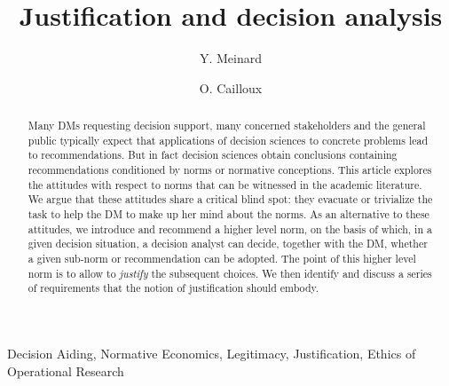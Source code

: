 \documentclass[preprint, french, english, 11pt, authoryear]{elsarticle}%
\begin{document}
\hypersetup{citecolor=black}
\title{Justification and decision analysis}

\author[ld]{Y. Meinard}
\author[ld]{O. Cailloux}
\address[ld]{Universit\'e Paris-Dauphine, PSL Research University, CNRS, UMR [7243], LAMSADE, 75016 PARIS, FRANCE}

\begin{abstract}
Many \acp{DM} requesting decision support, many concerned stakeholders and the general public typically expect that applications of decision sciences to concrete problems lead to recommendations. But in fact decision sciences obtain conclusions containing recommendations conditioned by norms or normative conceptions. This article explores the attitudes with respect to norms that can be witnessed in the academic literature. We argue that these attitudes share a critical blind spot: they evacuate or trivialize the task to help the \ac{DM} to make up her mind about the norms. As an alternative to these attitudes, we introduce and recommend a higher level norm, on the basis of which, in a given decision situation, a decision analyst can decide, together with the \ac{DM}, whether a given sub-norm or recommendation can be adopted. The point of this higher level norm is to allow to \emph{justify} the subsequent choices. We then identify and discuss a series of requirements that the notion of justification should embody.
\end{abstract}
\acresetall
\begin{keyword}
Decision Aiding, Normative Economics, Legitimacy, Justification, Ethics of Operational Research
\end{keyword}

\maketitle
\end{document}
